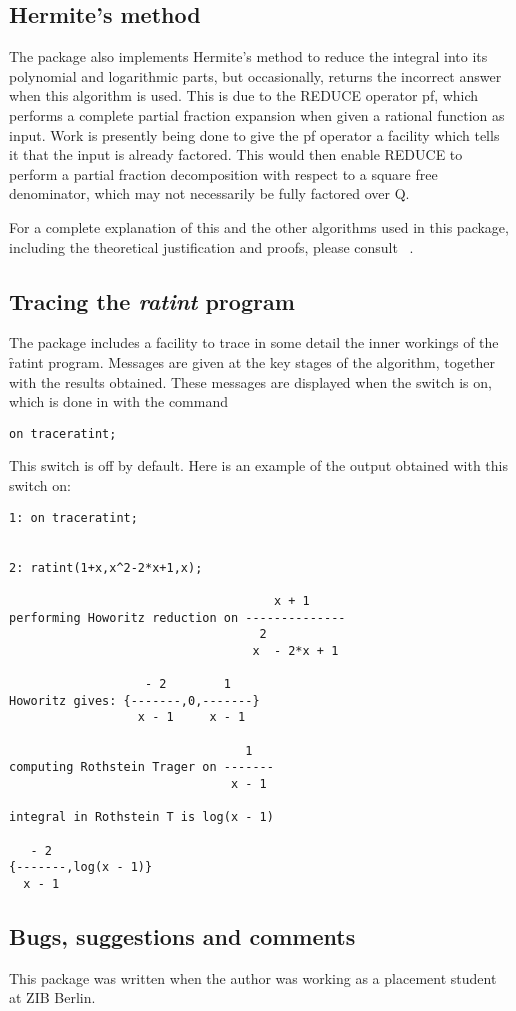 \subsection{Hermite's method}
The package also implements Hermite's method to reduce the integral into its polynomial and logarithmic parts, but occasionally, \REDUCE returns the incorrect answer when this algorithm is used. This is due to the REDUCE operator pf, which performs a complete partial fraction expansion when given a rational function as input. Work is presently being done to give the pf operator a facility which tells it that the input is already factored. This would then enable REDUCE to perform a partial fraction decomposition with respect to a square free denominator, which may not necessarily be fully factored over Q.

For a complete explanation of this and the other algorithms used in this package, including the theoretical justification and proofs, please consult ~\cite{Geddes:92}.

\subsection{Tracing the \emph{ratint} program}
The package includes a facility to trace in some detail the inner workings of the \f{ratint} program. Messages are given at the key stages of the algorithm, together with the results obtained. These messages are displayed when the switch  is on, which is done in \REDUCE with the command
\hypertarget{switch:TRACERATINT}{}
\begin{verbatim}
on traceratint;
\end{verbatim}
This switch is off by default. Here is an example of the output obtained with this switch on:

\begin{verbatim}
1: on traceratint;


2: ratint(1+x,x^2-2*x+1,x);

                                     x + 1
performing Howoritz reduction on --------------
                                   2
                                  x  - 2*x + 1

                   - 2        1
Howoritz gives: {-------,0,-------}
                  x - 1     x - 1

                                 1
computing Rothstein Trager on -------
                               x - 1

integral in Rothstein T is log(x - 1)

   - 2
{-------,log(x - 1)}
  x - 1
\end{verbatim}

\subsection{Bugs, suggestions and comments}
This package was written when the author was working as a placement student at ZIB Berlin.
